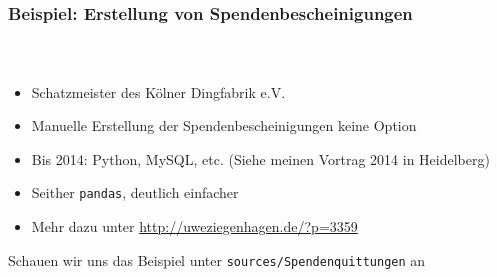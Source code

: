 \documentclass[12pt,ngerman]{beamer}
\begin{document}
\begin{frame}
\frametitle{Beispiel: Erstellung von Spendenbescheinigungen}
\framesubtitle{~}

\begin{itemize}
\item Schatzmeister des Kölner Dingfabrik e.V.
\item Manuelle Erstellung der Spendenbescheinigungen keine Option
\item Bis 2014: Python, MySQL, etc. (Siehe meinen Vortrag 2014 in Heidelberg)
\item Seither \texttt{pandas}, deutlich einfacher
\item Mehr dazu unter \url{http://uweziegenhagen.de/?p=3359}
\end{itemize}

Schauen wir uns das Beispiel unter \texttt{sources/Spendenquittungen} an

\end{frame}
\end{document}
